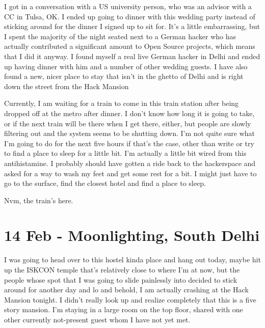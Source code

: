 \documentclass[11pt]{amsart}
\begin{document}
I got in a conversation with a US university person, who was an advisor with a CC in Tulsa, OK. I ended up going to dinner with this wedding party instead of sticking around for the dinner I signed up to sit for. It's a little embarrassing, but I spent the majority of the night seated next to a German hacker who has actually contributed a significant amount to Open Source projects, which means that I did it anyway. I found myself a real live German hacker in Delhi and ended up having dinner with him and a number of other wedding guests. I have also found a new, nicer place to stay that isn't in the ghetto of Delhi and is right down the street from the Hack Mansion

Currently, I am waiting for a train to come in this train station after being dropped off at the metro after dinner. I don't know how long it is going to take, or if the next train will be there when I get there, either, but people are slowly filtering out and the system seems to be shutting down. I'm not quite sure what I'm going to do for the next five hours if that's the case, other than write or try to find a place to sleep for a little bit. I'm actually a little bit wired from this antihistamine. I probably should have gotten a ride back to the hackerspace and asked for a way to wash my feet and get some rest for a bit. I might just have to go to the surface, find the closest hotel and find a place to sleep.

Nvm, the train's here.

\section{14 Feb - Moonlighting, South Delhi}

I was going to head over to this hostel kinda place and hang out today, maybe hit up the ISKCON temple that's relatively close to where I'm at now, but the people whose spot that I was going to slide painlessly into decided to stick around for another day and lo and behold, I am actually crashing at the Hack Mansion tonight. I didn't really look up and realize completely that this is a five story mansion. I'm staying in a large room on the top floor, shared with one other currently not-present guest whom I have not yet met.
\end{document}
